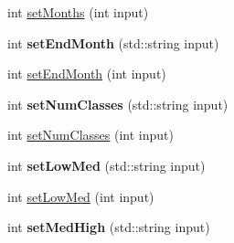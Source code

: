 \begin{DoxyCompactItemize}
\item 
int \hyperlink{classPrm_a1ec963ce2b62e1b8204359ff9b866594}{set\-Months} (int input)
\item 
\hypertarget{classPrm_a5b68286bb01cde3df0d20edf054376ec}{int {\bfseries set\-End\-Month} (std\-::string input)}\label{classPrm_a5b68286bb01cde3df0d20edf054376ec}

\item 
int \hyperlink{classPrm_a9969866d5164f0c3f9e36d4f9dcf9c39}{set\-End\-Month} (int input)
\item 
\hypertarget{classPrm_a41a08f019fbcc51bf216fe05988e852e}{int {\bfseries set\-Num\-Classes} (std\-::string input)}\label{classPrm_a41a08f019fbcc51bf216fe05988e852e}

\item 
int \hyperlink{classPrm_aa550e90d96cc91c51a0f3ee3ab8e2dfb}{set\-Num\-Classes} (int input)
\item 
\hypertarget{classPrm_a3a607c7564a6f5de8227bf7ae02f29d2}{int {\bfseries set\-Low\-Med} (std\-::string input)}\label{classPrm_a3a607c7564a6f5de8227bf7ae02f29d2}

\item 
int \hyperlink{classPrm_a3dc50c1d3a899a91f822f9d099103138}{set\-Low\-Med} (int input)
\item 
\hypertarget{classPrm_ae00662e4bb3a50e88be3cef70828057c}{int {\bfseries set\-Med\-High} (std\-::string input)}\label{classPrm_ae00662e4bb3a50e88be3cef70828057c}


\end{DoxyCompactItemize}

